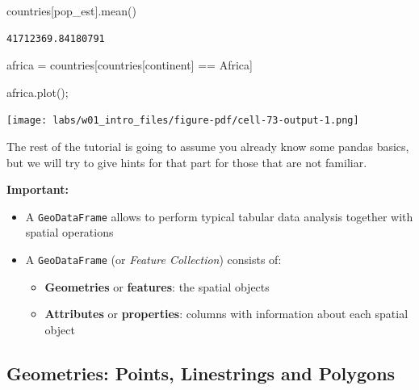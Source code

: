 \documentclass[
  letterpaper,
  DIV=11,
  numbers=noendperiod]{scrreprt}
\newenvironment{Shaded}{\begin{snugshade}}{\end{snugshade}}
\newcommand{\NormalTok}[1]{\textcolor[rgb]{0.00,0.23,0.31}{#1}}
\newcommand{\OperatorTok}[1]{\textcolor[rgb]{0.37,0.37,0.37}{#1}}
\newcommand{\StringTok}[1]{\textcolor[rgb]{0.13,0.47,0.30}{#1}}
\providecommand{\tightlist}{%
  \setlength{\itemsep}{0pt}\setlength{\parskip}{0pt}}\usepackage{longtable,booktabs,array}
\begin{document}
\begin{Shaded}
\begin{Highlighting}[]
\NormalTok{countries[}\StringTok{\textquotesingle{}pop\_est\textquotesingle{}}\NormalTok{].mean()}
\end{Highlighting}
\end{Shaded}

\begin{verbatim}
41712369.84180791
\end{verbatim}

\begin{Shaded}
\begin{Highlighting}[]
\NormalTok{africa }\OperatorTok{=}\NormalTok{ countries[countries[}\StringTok{\textquotesingle{}continent\textquotesingle{}}\NormalTok{] }\OperatorTok{==} \StringTok{\textquotesingle{}Africa\textquotesingle{}}\NormalTok{]}
\end{Highlighting}
\end{Shaded}

\begin{Shaded}
\begin{Highlighting}[]
\NormalTok{africa.plot()}\OperatorTok{;}
\end{Highlighting}
\end{Shaded}

\texttt{[image: labs/w01\_intro\_files/figure-pdf/cell-73-output-1.png]}

The rest of the tutorial is going to assume you already know some pandas
basics, but we will try to give hints for that part for those that are
not familiar.

\textbf{Important:}

\begin{itemize}
\tightlist
\item
  A \texttt{GeoDataFrame} allows to perform typical tabular data
  analysis together with spatial operations
\item
  A \texttt{GeoDataFrame} (or \emph{Feature Collection}) consists of:

  \begin{itemize}
  \tightlist
  \item
    \textbf{Geometries} or \textbf{features}: the spatial objects
  \item
    \textbf{Attributes} or \textbf{properties}: columns with information
    about each spatial object
  \end{itemize}
\end{itemize}

\subsection{Geometries: Points, Linestrings and
Polygons}\label{geometries-points-linestrings-and-polygons}
\end{document}
